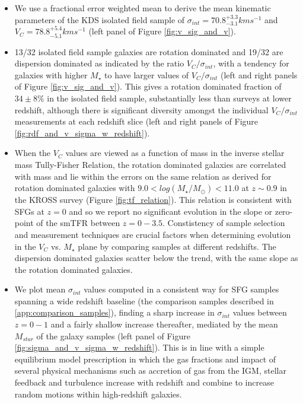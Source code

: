 \documentclass[fleqn,usenatbib]{mn2e}
\begin{document}
\begin{itemize}
    \item We use a fractional error weighted mean to derive the mean kinematic parameters of the KDS isolated field sample of $\sigma_{int} = 70.8^{+3.3}_{-3.1} kms^{-1}$ and $V_{C} = 78.8^{+5.4}_{-5.1}kms^{-1}$ (left panel of Figure \ref{fig:v_sig_and_v}). 
    \item 13/32 isolated field sample galaxies are rotation dominated and 19/32 are dispersion dominated as indicated by the ratio $V_{C}/\sigma_{int}$, with a tendency for galaxies with higher $M_{\star}$ to have larger values of $V_{C}/\sigma_{int}$ (left and right panels of Figure \ref{fig:v_sig_and_v}).
    This gives a rotation dominated fraction of $34 \pm 8 \%$ in the isolated field sample, substantially less than surveys at lower redshift, although there is significant diversity amongst the individual $V_{C}/\sigma_{int}$ measurements at each redshift slice (left and right panels of Figure \ref{fig:rdf_and_v_sigma_w_redshift}).
    \item When the $V_{C}$ values are viewed as a function of mass in the inverse stellar mass Tully-Fisher Relation, the rotation dominated galaxies are correlated with mass and lie within the errors on the same relation as derived for rotation dominated galaxies with $9.0 < log(M_{\star}/M_{\odot}) < 11.0$ at $z\sim0.9$ in the KROSS survey (Figure \ref{fig:tf_relation}). %
    This relation is consistent with SFGs at $z=0$ and so we report no significant evolution in the slope or zero-point of the smTFR between $z=0-3.5$.
    Constistency of sample selection and measurement techniques are crucial factors when determining evolution in the $V_{C}$ vs. $M_{\star}$ plane by comparing samples at different redshifts.
    The dispersion dominated galaxies scatter below the trend, with the same slope as the rotation dominated galaxies.
    \item We plot mean $\sigma_{int}$ values computed in a consistent way for SFG samples spanning a wide redshift baseline (the comparison samples described in \cref{app:comparison_samples}), finding a sharp increase in $\sigma_{int}$ values between $z=0-1$ and a fairly shallow increase thereafter, mediated by the mean $M_{star}$ of the galaxy samples (left panel of Figure \ref{fig:sigma_and_v_sigma_w_redshift}).
    This is in line with a simple equilibrium model prescription in which the gas fractions and impact of several physical mechanisms such as accretion of gas from the IGM, stellar feedback and turbulence increase with redshift and combine to increase random motions within high-redshift galaxies.

\end{itemize}
\end{document}
